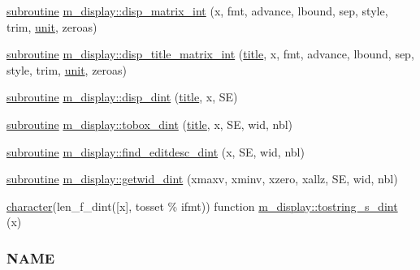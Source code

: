 \begin{DoxyCompactItemize}
\item 
\hyperlink{M__stopwatch_83_8txt_acfbcff50169d691ff02d4a123ed70482}{subroutine} \hyperlink{namespacem__display_a00d35e9c84ad3f0238e4598f09f79961}{m\+\_\+display\+::disp\+\_\+matrix\+\_\+int} (x, fmt, advance, lbound, sep, style, trim, \hyperlink{M__stopwatch_83_8txt_a5cbef30eb7c0d734bd82f5a7ebea9aa7}{unit}, zeroas)
\item 
\hyperlink{M__stopwatch_83_8txt_acfbcff50169d691ff02d4a123ed70482}{subroutine} \hyperlink{namespacem__display_aa95be71bcd8730f4f01393ea6ede4bec}{m\+\_\+display\+::disp\+\_\+title\+\_\+matrix\+\_\+int} (\hyperlink{print__watch_83_8txt_a15b5bd21156bb9fca6a755ab8c029a9c}{title}, x, fmt, advance, lbound, sep, style, trim, \hyperlink{M__stopwatch_83_8txt_a5cbef30eb7c0d734bd82f5a7ebea9aa7}{unit}, zeroas)
\item 
\hyperlink{M__stopwatch_83_8txt_acfbcff50169d691ff02d4a123ed70482}{subroutine} \hyperlink{namespacem__display_a0e150cc23de78529e22b17b1873a9e6e}{m\+\_\+display\+::disp\+\_\+dint} (\hyperlink{print__watch_83_8txt_a15b5bd21156bb9fca6a755ab8c029a9c}{title}, x, SE)
\item 
\hyperlink{M__stopwatch_83_8txt_acfbcff50169d691ff02d4a123ed70482}{subroutine} \hyperlink{namespacem__display_a305dbf4f9072f9d1551a24c0f26ad508}{m\+\_\+display\+::tobox\+\_\+dint} (\hyperlink{print__watch_83_8txt_a15b5bd21156bb9fca6a755ab8c029a9c}{title}, x, SE, wid, nbl)
\item 
\hyperlink{M__stopwatch_83_8txt_acfbcff50169d691ff02d4a123ed70482}{subroutine} \hyperlink{namespacem__display_ab6e1e0eb1c077b4d2a0c6698c78925a3}{m\+\_\+display\+::find\+\_\+editdesc\+\_\+dint} (x, SE, wid, nbl)
\item 
\hyperlink{M__stopwatch_83_8txt_acfbcff50169d691ff02d4a123ed70482}{subroutine} \hyperlink{namespacem__display_a6d7287cccf11d65c1821020ef61c7992}{m\+\_\+display\+::getwid\+\_\+dint} (xmaxv, xminv, xzero, xallz, SE, wid, nbl)
\item 
\hyperlink{option__stopwatch_83_8txt_abd4b21fbbd175834027b5224bfe97e66}{character}(len\+\_\+f\+\_\+dint(\mbox{[}x\mbox{]}, tosset \% ifmt)) function \hyperlink{namespacem__display_a5bfeb905fb5036068ef0012eb2f563fa}{m\+\_\+display\+::tostring\+\_\+s\+\_\+dint} (x)
\begin{DoxyCompactList}\small\item\em \subsubsection*{N\+A\+ME}


\end{DoxyCompactList}
\end{DoxyCompactItemize}
